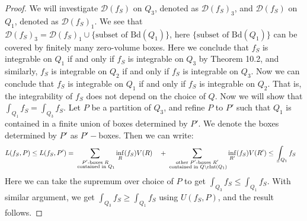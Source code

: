 \documentclass[11pt,oneside]{book}
\theoremstyle{break}
\theoremstyle{break}
\def\lowint{\mkern3mu\underline{\vphantom{\intop}\mkern7mu}\mkern-10mu\int}
\newcommand{\D}{\mathcal{D}}
\newcommand{\Bd}{\text{Bd}}
\begin{document}
\begin{proof}
We will investigate $\D(f_S)$ on $Q_3$, denoted as $\D(f_S)_3$, and $\D(f_S)$ on $Q_1$, denoted as $\D(f_S)_1$. We see that $\D(f_S)_3 = \D(f_S)_1 \cup \{ \text{subset of }\Bd(Q_1)\}$, here $\{ \text{subset of }\Bd(Q_1)\}$ can be covered by finitely many zero-volume boxes. Here we conclude that $f_S$ is integrable on $Q_1$ if and only if $f_S$ is integrable on $Q_3$ by Theorem 10.2, and similarly, $f_S$ is integrable on $Q_2$ if and only if $f_S$ is integrable on $Q_3$. Now we can conclude that $f_S$ is integrable on $Q_1$ if and only if $f_S$ is integrable on $Q_2$. That is, the integrability of $f_S$ does not depend on the choice of $Q$. Now we will show that $\int_{Q_1} f_S = \int_{Q_3} f_S$. Let $P $ be a partition of $Q_3$, and refine $P$ to $P'$ such that $Q_1$ is contained in a finite union of boxes determined by $P'$. We denote the boxes determined by $P'$ as $P'-$boxes. Then we can write:
\begin{align*}
L(f_S,P) \leq L(f_S, P') &= \sum_{\substack{P' \text{-boxes } R  \\ \text{ contained in } Q_1}} \inf_R (f_S) V(R) \quad + \sum_{\substack{\text{other }P'\text{-boxes } R' \\ \text{ contained in }Q \setminus \text{rInt}(Q_1)}} \inf_{R' }(f_S) V(R') \leq \lowint_{Q_1} f_S
\end{align*}
Here we can take the supremum over choice of $P$ to get $\int_{Q_3} f_S \leq \int_{Q_1} f_S$. With similar argument, we get $\int_{Q_3} f_S \geq \int_{Q_1} f_S$ using $U(f_S,P)$, and the result follows. 
\end{proof}
\end{document}
